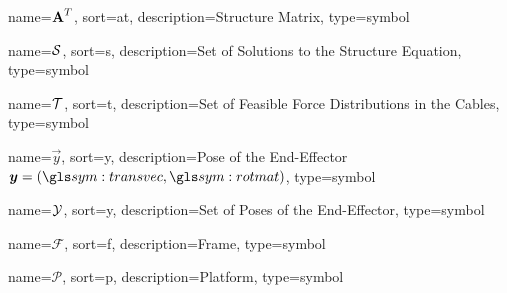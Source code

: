 	{%
		name=\ensuremath{{\mat{A}^T}},
		sort=at,
		description=Structure Matrix,
		type=symbol
	}
	\newcommand{\strucmat}{\gls{sym:strucmat}}

	{%
		name=\ensuremath{\set{S}},
		sort=s,
		description=Set of Solutions to the Structure Equation,
		type=symbol
	}
	\newcommand{\setsolstruceq}{\gls{sym:setsolstruceq}}

	{%
		name=\ensuremath{\set{T}},
		sort=t,
		description=Set of Feasible Force Distributions in the Cables,
		type=symbol
	}
	\newcommand{\setoffeasibleforces}{\gls{sym:setoffeasibleforces}}

	{%
		name=\ensuremath{\vec{y}},
		sort=y,
		description=Pose of the End-Effector \ensuremath{\vec{y} = (\transvec, \rotmatbare)},
		type=symbol
	}
	\newcommand{\pose}{\gls{sym:pose}}

	{%
		name=\ensuremath{\set{Y}},
		sort=y,
		description=Set of Poses of the End-Effector,
		type=symbol
	}
	\newcommand{\setofposes}{\gls{sym:setofposes}}

	{%
		name=\ensuremath{\mathscr{F}},
		sort=f,
		description=Frame,
		type=symbol
	}
	\newcommand{\framesym}{\gls{sym:frame}}

	{%
		name=\ensuremath{\mathscr{P}},
		sort=p,
		description=Platform,
		type=symbol
	}
	\newcommand{\platform}{\gls{sym:platform}}
	\newcommand{\platformframe}{\framesym_{\platform}}
	\newcommand{\worldframe}{\framesym_{\world}} %

